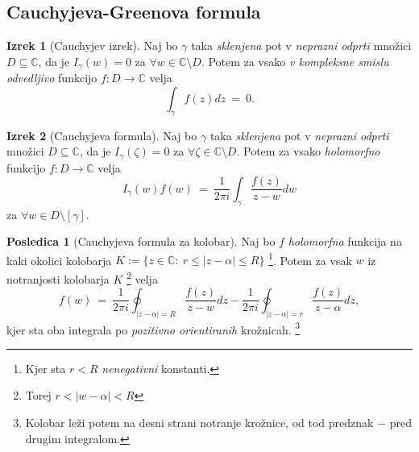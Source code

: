 \documentclass[11pt]{article}
\theoremstyle{definition}
\theoremstyle{definition}
\theoremstyle{definition}
\newtheorem{izrek}{Izrek}[section]
\newtheorem*{posledica}{Posledica}
\begin{document}

\subsection{Cauchyjeva-Greenova formula}
\vspace{0.5cm}

\begin{izrek}[Cauchyjev izrek]

Naj bo $\gamma$ taka \textit{sklenjena} pot v \textit{neprazni odprti} množici $D \subseteq \mathbb{C}$, da je $I_{\gamma}(w) = 0$ za $\forall w \in \mathbb{C} \setminus D$. Potem za vsako \textit{v kompleksne smislu odvedljivo} funkcijo $f: D \rightarrow \mathbb{C}$ velja
$$\int_{\gamma} f(z) dz ~=~ 0.$$

\end{izrek}
\vspace{0.5cm}

\begin{izrek}[Cauchyjeva formula]

Naj bo $\gamma$ taka \textit{sklenjena} pot v \textit{neprazni odprti} množici $D \subseteq \mathbb{C}$, da je $I_{\gamma}(\zeta) = 0$ za $\forall \zeta \in \mathbb{C} \setminus D$. Potem za vsako \textit{holomorfno} funkcijo $f: D \rightarrow \mathbb{C}$ velja
$$I_{\gamma}(w)f(w) ~=~ \frac{1}{2 \pi i} \int_{\gamma} \frac{f(z)}{z - w} dw$$
za $\forall w \in D \setminus [\gamma]$.

\end{izrek}
\vspace{0.5cm}

\begin{posledica}[Cauchyjeva formula za kolobar]

Naj bo $f$ \textit{holomorfna} funkcija na kaki okolici kolobarja $K := \{ z \in \mathbb{C}: ~r \leq |z - \alpha| \leq R \}$ \footnote{Kjer sta $r < R$ \textit{nenegativni} konstanti.}. Potem za vsak $w$ iz notranjosti kolobarja $K$ \footnote{Torej $r < |w - \alpha| < R$} velja
$$f(w) ~=~ \frac{1}{2 \pi i} \oint_{|z - \alpha| = R} \frac{f(z)}{z - w} dz - \frac{1}{2 \pi i} \oint_{|z - \alpha| = r} \frac{f(z)}{z - \alpha} dz,$$
kjer sta oba integrala po \textit{pozitivno orientiranih} krožnicah. \footnote{Kolobar leži potem na desni strani notranje krožnice, od tod predznak $-$ pred drugim integralom.}

\end{posledica}
\vspace{0.5cm}
\end{document}
